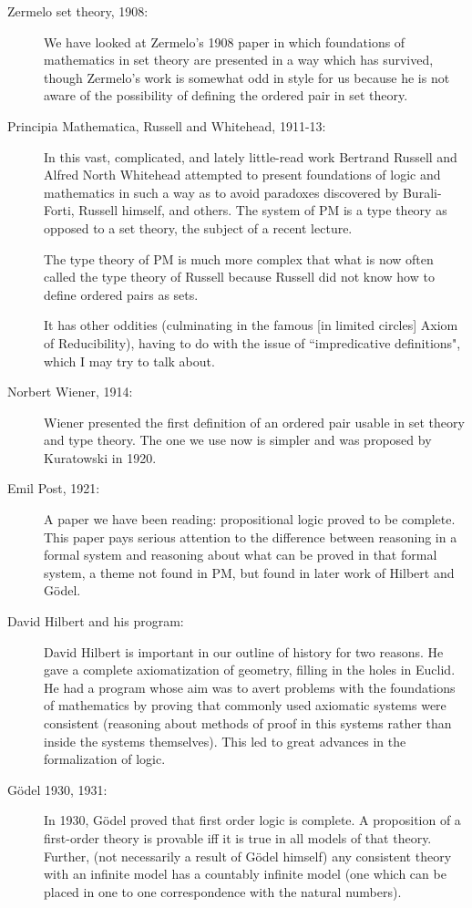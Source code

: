 \documentclass[12pt]{article}
\begin{document}
\begin{description}
\item[Zermelo set theory, 1908:]  We have looked at Zermelo's 1908 paper in which foundations of mathematics in set theory are presented in a way which has survived, though
Zermelo's work is somewhat odd in style for us because he is not aware of the possibility of defining the ordered pair in set theory.

\item[Principia Mathematica, Russell and Whitehead, 1911-13:]  In this vast, complicated, and lately little-read work Bertrand Russell and Alfred North Whitehead attempted to present
foundations of logic and mathematics in such a way as to avoid paradoxes discovered by Burali-Forti, Russell himself, and others.  The system of PM is a type theory as opposed to a set theory, the subject of a recent lecture.

The type theory of PM is much more complex that what is now often called the type theory of Russell because Russell did not know how to define ordered pairs as sets.

It has other oddities (culminating in the famous [in limited circles] Axiom of Reducibility), having to do with the issue of ``impredicative definitions", which I may try to talk about.

\item[Norbert Wiener, 1914:]  Wiener presented the first definition of an ordered pair usable in set theory and type theory.  The one we use now is simpler and was proposed by Kuratowski in 1920.

\item[Emil Post, 1921:]  A paper we have been reading:  propositional logic proved to be complete.  This paper pays serious attention to the difference between reasoning in a formal system and reasoning about what can be proved in that formal system, a theme not found in PM, but found in later work of Hilbert and G\"odel.

\item[David Hilbert and his program:]  David Hilbert is important in our outline of history for two reasons.  He gave a complete axiomatization of geometry, filling in the holes in Euclid.
He had a program whose aim was to avert problems with the foundations of mathematics by proving that commonly used axiomatic systems were consistent (reasoning about methods of proof in this systems rather than inside the systems themselves).  This led to great advances in the formalization of logic.

\item[G\"odel 1930, 1931:]  In 1930, G\"odel proved that first order logic is complete.  A proposition of a first-order theory is provable iff it is true in all models of that theory.  Further,
(not necessarily a result of G\"odel himself) any consistent theory with an infinite model has a countably infinite model (one which can be placed in one to one correspondence with the natural numbers).


\end{description}
\end{document}
